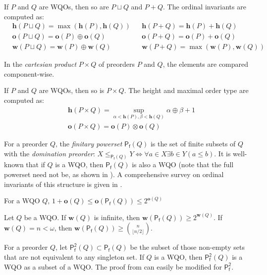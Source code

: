 \documentclass[runningheads]{llncs}
\let \leq \leqslant
\let \geq \geqslant
\renewcommand \S [1][]{\mathsf{P_f^{#1}}}
\def \h {\textbf{h}}
\def \o {\textbf{o}}
\def \w {\textbf{w}}
\begin{document}
\begin{lemma}\label{h o w(cup)}
    If $P$ and $Q$ are WQOs, then so are $P \sqcup Q$ and $P + Q$. The ordinal invariants are computed as:
    \begin{align*}
        &\h(P \sqcup Q)=\max(\h(P),\h(Q))&&\h(P+Q)=\h(P)+\h(Q)\\
        &\o(P \sqcup Q)=\o(P)\oplus\o(Q)&&\o(P+Q)=\o(P)+\o(Q)\\
        &\w(P \sqcup Q)=\w(P)\oplus\w(Q)&&\w(P+Q)=\max(\w(P),\w(Q))
    \end{align*}
\end{lemma}

In the \textit{cartesian product} $P \times Q$ of preorders $P$ and $Q$, the elements are compared component-wise.

\begin{lemma}\label{h o(times)}
    If $P$ and $Q$ are WQOs, then so is $P \times Q$. The height and maximal order type are computed as:
    \begin{align*}
        &\h(P \times Q) = \sup_{\alpha < \h(P), \beta < \h(Q)} \alpha\oplus\beta+1\\
        &\o(P \times Q) = \o(P) \otimes \o(Q)
    \end{align*}
\end{lemma}

For a preorder $Q$, the \textit{finitary powerset} $\S(Q)$ is the set of finite subsets of $Q$ with the \textit{domination preorder}: $X \leq_{\S(Q)} Y \iff \forall a \in X \exists b \in Y (a \leq b)$. It is well-known that if $Q$ is a WQO, then $\S(Q)$ is also a WQO (note that the full powerset need not be, as shown in \cite{Rado1954}). A comprehensive survey on ordinal invariants of this structure is given in \cite{Abriola2023}.

\begin{lemma}\label{o(S)}
    For a WQO $Q$, $1+\o(Q) \leq \o(\S(Q)) \leq 2^{\o(Q)}$
\end{lemma}

\begin{lemma}\label{w(S)}
    Let $Q$ be a WQO. If $\w(Q)$ is infinite, then $\w(\S(Q)) \geq 2^{\w(Q)}$. If $\w(Q) = n < \omega$, then $\w(\S(Q)) \geq \binom{n}{\lfloor n/2 \rfloor}$.
\end{lemma}

For a preorder $Q$, let $\S[2](Q) \subset \S(Q)$ be the subset of those non-empty sets that are not equivalent to any singleton set. If $Q$ is a WQO, then $\S[2](Q)$ is a WQO as a subset of a WQO. The proof from \cite[theorem 3.11]{Abriola2023} can easily be modified for $\S[2]$.
\end{document}
